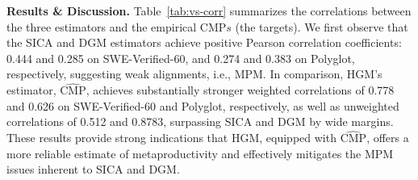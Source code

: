 \documentclass{article} %
\begin{document}
  
\begin{table}[t!]
  \centering
  \label{tab:vs-corr}
  \renewcommand\arraystretch{1.2} 
\end{table}

\textbf{Results \& Discussion.} Table~\ref{tab:vs-corr} summarizes the correlations between the three estimators and the empirical $\mathrm{CMP}s$ (the targets). We first observe that the SICA and DGM estimators achieve positive Pearson correlation coefficients: 0.444 and 0.285 on SWE-Verified-60, and 0.274 and 0.383 on Polyglot, respectively, suggesting weak alignments, i.e., MPM. 
In comparison, HGM's estimator, $\widehat{\mathrm{CMP}}$, achieves substantially stronger weighted correlations of 0.778 and 0.626 on SWE-Verified-60 and Polyglot, respectively, as well as unweighted correlations of 0.512 and 0.8783, surpassing SICA and DGM by wide margins.
These results provide strong indications that HGM, equipped with $\widehat{\mathrm{CMP}}$, offers a more reliable estimate of metaproductivity and effectively mitigates the MPM issues inherent to SICA and DGM. 
\end{document}
